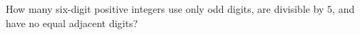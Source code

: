 How many six-digit positive integers use only odd digits, are divisible by $5$, and have no equal adjacent digits?
